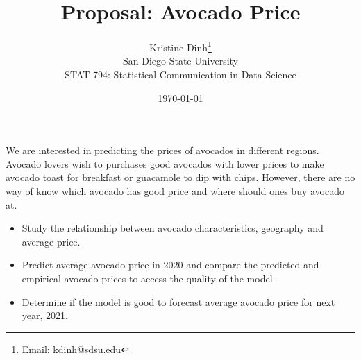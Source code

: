 \documentclass[11pt]{article}
\begin{document}
\title{Proposal: Avocado Price}
\author{Kristine Dinh\thanks{Email: kdinh@sdsu.edu} \\
San Diego State University \\ STAT 794: Statistical Communication in Data Science}

\date{\today}

\maketitle
%
%


We are interested in predicting the prices of avocados in different regions. Avocado lovers wish to purchases good avocados with lower prices to make avocado toast for breakfast or guacamole to dip with chips. However, there are no way of know which avocado has good price and where should ones buy avocado at. 

\vspace{0.5cm}

\begin{itemize}
\item Study the relationship between avocado characteristics, geography and average price. 
\item Predict average avocado price in 2020 and compare the predicted and empirical avocado prices to access the quality of the model.
\item Determine if the model is good to forecast average avocado price for next year, 2021. 
\end{itemize}

\vspace{0.5cm}
\end{document}
